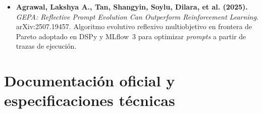 {\begin{itemize}[itemsep=3pt, topsep=3pt]
  \item \textbf{Agrawal, Lakshya A., Tan, Shangyin, Soylu, Dilara, et al. (2025).} \textit{GEPA: Reflective Prompt Evolution Can Outperform Reinforcement Learning}. arXiv:2507.19457.
  Algoritmo evolutivo reflexivo multiobjetivo en frontera de Pareto adoptado en DSPy y MLflow~3 para optimizar \textit{prompts} a partir de trazas de ejecución.
\end{itemize}
}

\section{Documentación oficial y especificaciones técnicas}\label{sec:bib-docs}


